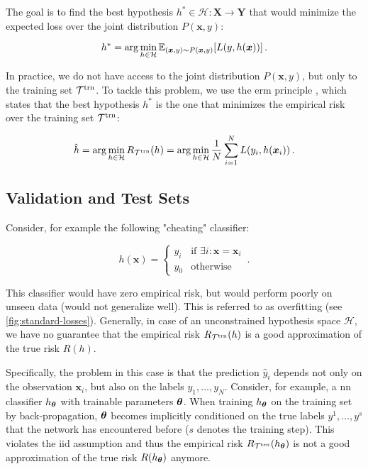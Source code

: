 The goal is to find the best hypothesis $h^* \in \mathcal{H}:
    \mathbf{X} \rightarrow \mathbf{Y}$ that would minimize the expected loss over the joint distribution $P(\bm{x}, y)$:

\begin{equation}
    h^* = \arg \min_{h \in \mathcal{H}} \mathbb{E}_{(\bm{x}, y) \sim P(\bm{x}, y)}[L(y, h(\bm{x}))]\,.
\end{equation}

In practice, we do not have access to the joint distribution $P(\bm{x}, y)$, but only to the training set ${\mathcal{T}^\text{trn}}$. To
tackle this problem, we use the \gls{erm} principle \cite{risk-minimization}, which states that the best hypothesis
$h^*$ is the one that minimizes the empirical risk over the training set ${\mathcal{T}^\text{trn}}$:

\begin{equation}
    \hat{h} = \arg \min_{h \in \mathcal{H}} R_{\mathcal{T}^\text{trn}}(h) = \arg \min_{h \in \mathcal{H}} \frac{1}{N} \sum_{i=1}^{N} L(y_i, h(\bm{x}_i))\,.
\end{equation}










\subsection{Validation and Test Sets}

Consider, for example the following "cheating" classifier:

\begin{equation}
    h(\bm{x}) = \begin{cases}
        y_i & \text{if } \exists i : \bm{x} = \bm{x}_i \\
        y_0 & \text{otherwise}
    \end{cases}\,.
\end{equation}


This classifier would have zero empirical risk, but would perform poorly on unseen data (would not generalize well).
This is referred to as overfitting (see \autoref{fig:standard-losses}). Generally, in case of an unconstrained
hypothesis space $\mathcal{H}$, we have no guarantee that the empirical risk $R_{\mathcal{T}^\text{trn}}(h)$ is a good approximation of the
true risk $R(h)$.


Specifically, the problem in this case is that the prediction $\hat{y}_i$ depends not only on the observation
$\bm{x}_i$, but also on the labels $y_1, \dots, y_N$. Consider, for example, a \gls{nn} classifier $h_{{\boldsymbol{\theta}}}$ with trainable
parameters ${\boldsymbol{\theta}}$. When training $h_{{\boldsymbol{\theta}}}$ on the training set by back-propagation, ${\boldsymbol{\theta}}$  becomes implicitly
conditioned on the true labels $y^1, \dots, y^s$ that the network has encountered before ($s$ denotes the training step).
This violates the \gls{iid} assumption and thus the empirical risk $R_{\mathcal{T}^\text{trn}}(h_{{\boldsymbol{\theta}}})$ is not a good approximation of
the true risk $R(h_{{\boldsymbol{\theta}}})$ anymore.



